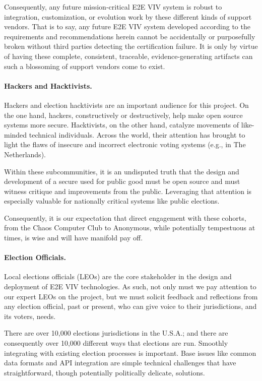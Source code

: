 Consequently, any future mission-critical E2E VIV system is robust to
integration, customization, or evolution work by these different kinds
of support vendors. That is to say, any future E2E VIV system
developed according to the requirements and recommendations herein
cannot be accidentally or purposefully broken without third parties
detecting the certification failure. It is only by virtue of having
these complete, consistent, traceable, evidence-generating artifacts
can such a blossoming of support vendors come to exist.

\paragraph{Hackers and Hacktivists.} Hackers and election hacktivists
are an important audience for this project. On the one hand, hackers,
constructively or destructively, help make open source systems more
secure.  Hacktivists, on the other hand, catalyze movements of
like-minded technical individuals. Across the world, their attention
has brought to light the flaws of insecure and incorrect electronic
voting systems (e.g., in The Netherlands).

Within these subcommunities, it is an undisputed truth that the design
and development of a secure used for public good must be open source
and must witness critique and improvements from the public. Leveraging
that attention is especially valuable for nationally critical systems
like public elections.

Consequently, it is our expectation that direct engagement with these
cohorts, from the Chaos Computer Club to Anonymous, while potentially
tempestuous at times, is wise and will have manifold pay off.

\paragraph{Election Officials.} Local elections officials (LEOs) are
the core stakeholder in the design and deployment of E2E VIV
technologies.  As such, not only must we pay attention to our expert
LEOs on the project, but we must solicit feedback and reflections from
any election official, past or present, who can give voice to their
jurisdictions, and its voters, needs.

There are over 10,000 elections jurisdictions in the U.S.A.; and there
are consequently over 10,000 different ways that elections are
run. Smoothly integrating with existing election processes is
important. Base issues like common data formats and API integration
are simple technical challenges that have straightforward, though
potentially politically delicate, solutions.

